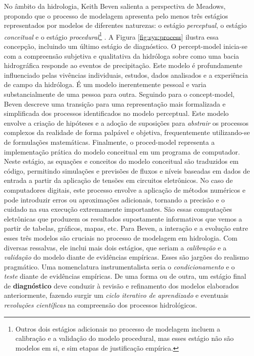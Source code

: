 \documentclass[./main.tex]{subfiles}
\begin{document}
\par No âmbito da hidrologia, Keith Beven salienta a perspectiva de Meadows, propondo que o processo de modelagem apresenta pelo menos três estágios representados por modelos de diferentes naturezas: o estágio \textit{perceptual}, o estágio \textit{conceitual} e o estágio \textit{procedural}\footnote{Outros dois estágios adicionais no processo de modelagem incluem a calibração e a validação do modelo procedural, mas esses estágio não são modelos em si, e sim etapas de justificação empírica.} \cite{beven2011}. A Figura \ref{fig:sys:process} ilustra essa concepção, incluindo um último estágio de diagnóstico. O \gls{percept-model} inicia-se com a compreensão subjetiva e qualitativa da hidróloga sobre como uma bacia hidrográfica responde ao eventos de precipitação. Este modelo é profundamente influenciado pelas vivências individuais, estudos, dados analisados e a experiência de campo da hidróloga. É um modelo inerentemente pessoal e varia substancialmente de uma pessoa para outra. Seguindo para o \gls{concept-model}, Beven descreve uma transição para uma representação mais formalizada e simplificada dos processos identificados no modelo perceptual. Este modelo envolve a criação de hipóteses e a adoção de suposições para \textit{abstrair} os processos complexos da realidade de forma palpável e objetiva, frequentemente utilizando-se de formulações matemáticas. Finalmente, o \gls{proced-model} representa a implementação prática do modelo conceitual em um programa de computador. Neste estágio, as equações e conceitos do modelo conceitual são traduzidos em código, permitindo simulações e previsões de fluxos e níveis baseadas em dados de entrada a partir da aplicação de tensões em circuitos eletrônicos. No caso de computadores digitais, este processo envolve a aplicação de métodos numéricos e pode introduzir erros ou aproximações adicionais, tornando a precisão e o cuidado na sua execução extremamente importantes. São essas computações eletrônicas que produzem os resultados supostamente informativos que vemos a partir de tabelas, gráficos, mapas, etc. Para Beven, a interação e a evolução entre esses três modelos são cruciais no processo de modelagem em hidrologia. Com diversas ressalvas, ele inclui mais dois estágios, que seriam a \textit{calibração} e a \textit{validação} do modelo diante de evidências empíricas.  Esses são jargões do realismo pragmático. Uma nomenclatura instrumentalista seria o \textit{condicionamento} e o \textit{teste} diante de evidências empíricas. De uma forma ou de outra, um estágio final de \textbf{diagnóstico} deve conduzir à revisão e refinamento dos modelos elaborados anteriormente, fazendo surgir um \textit{ciclo iterativo de aprendizado} e eventuais \textit{revoluções científicas} na compreensão dos processos hidrológicos.
\end{document}
